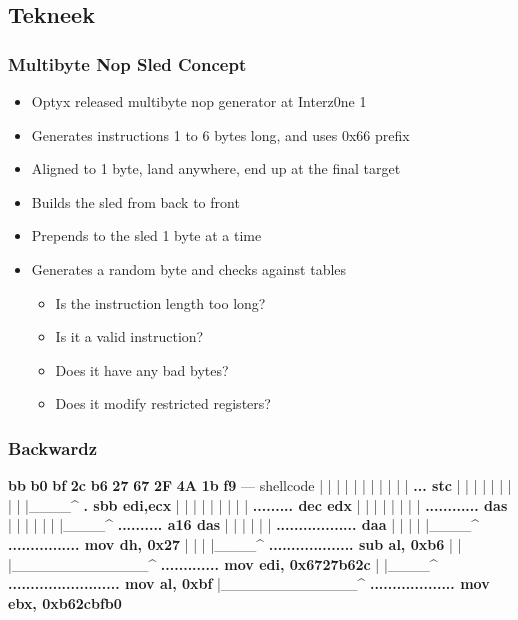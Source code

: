 \documentclass{beamer}
\newenvironment{sitemize}{\vspace{1mm}\begin{itemize}\itemsep 4pt\small}{\end{itemize}}
\begin{document}
\subsection{Tekneek}

\begin{frame}[t]
  \frametitle{Multibyte Nop Sled Concept}
  \begin{sitemize}
    \item Optyx released multibyte nop generator at Interz0ne 1
    \item Generates instructions 1 to 6 bytes long, and uses 0x66 prefix
    \item Aligned to 1 byte, land anywhere, end up at the final target
  \end{sitemize}
  \begin{sitemize}
    \pause
    \item Builds the sled from back to front
    \item Prepends to the sled 1 byte at a time
    \item Generates a random byte and checks against tables
    \pause
    \begin{sitemize}
      \item Is the instruction length too long?
      \item Is it a valid instruction?
      \item Does it have any bad bytes?
      \item Does it modify restricted registers?
    \end{sitemize}
  \end{sitemize}
\end{frame}

\begin{frame}[fragile]
  \frametitle{Backwardz}
  {\footnotesize
  \begin{semiverbatim}
  \textbf<11>{bb} \textbf<10,11>{b0} \textbf<9,10,11>{bf} \textbf<8,9,11>{2c} \textbf<7,8,9,11>{b6} \textbf<6,7,9>{27} \textbf<5,9>{67} \textbf<4,5>{2F} \textbf<3>{4A} \textbf<2>{1b} \textbf<1,2>{f9} --- shellcode
  |  |  |  |  |  |  |  |  |  |  | \textbf<1>{... stc}
  |  |  |  |  |  |  |  |  |  |____^ \textbf<2>{. sbb edi,ecx}
  |  |  |  |  |  |  |  |  | \textbf<3>{......... dec edx}
  |  |  |  |  |  |  |  | \textbf<4>{............ das}
  |  |  |  |  |  |  |____^ \textbf<5>{.......... a16 das}
  |  |  |  |  |  | \textbf<6>{.................. daa}
  |  |  |  |  |____^ \textbf<7>{................ mov dh, 0x27}
  |  |  |  |____^ \textbf<8>{................... sub al, 0xb6}
  |  |  |_____________^ \textbf<9>{............. mov edi, 0x6727b62c}
  |  |____^ \textbf<10>{......................... mov al, 0xbf}
  |_____________^ \textbf<11>{................... mov ebx, 0xb62cbfb0}
\end{semiverbatim}
}
\end{frame}
\end{document}
